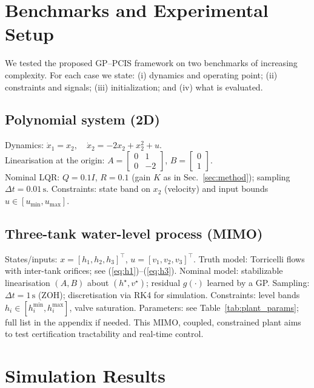 \documentclass[10pt]{article}
\newcommand{\1}{\mathbbm{1}}
\begin{document}
\section{Benchmarks and Experimental Setup}\label{sec:setup}

We tested the proposed GP–PCIS framework on two
benchmarks of increasing complexity. For each case we
state: (i) dynamics and operating point; (ii) constraints and signals;
(iii) initialization; and (iv) what is evaluated.

\subsection{Polynomial system (2D)}\label{subsec:poly}
Dynamics:
$\dot x_1 = x_2,\quad \dot x_2 = -2x_2 + x_2^2 + u$. \\
Linearisation at the origin:
$A=\begin{bmatrix}0&1\\0&-2\end{bmatrix}$,
$B=\begin{bmatrix}0\\1\end{bmatrix}$. \\
Nominal LQR: $Q=0.1I$, $R=0.1$ (gain $K$ as in Sec.~\ref{sec:method});
sampling $\Delta t=0.01\,\mathrm{s}$.
Constraints: state band on $x_2$ (velocity) and input bounds $u\in[u_{\min},u_{\max}]$.


\subsection{Three-tank water-level process (MIMO)}\label{subsec:tank}
States/inputs: $x=[h_1,h_2,h_3]^\top$, $u=[v_1,v_2,v_3]^\top$.
Truth model: Torricelli flows with inter-tank orifices; see (\ref{eq:h1})–(\ref{eq:h3}).
Nominal model: stabilizable linearisation $(A,B)$ about $(h^\star,v^\star)$; residual $g(\cdot)$ learned by a GP.
Sampling: $\Delta t=1\,\mathrm{s}$ (ZOH); discretisation via RK4 for simulation.
Constraints: level bands $h_i\in[h_i^{\min},h_i^{\max}]$, valve saturation.
Parameters: see Table~\ref{tab:plant_params}; full list in the appendix if needed.
This MIMO, coupled, constrained plant aims to test certification tractability and real-time control.

%
%
\section{Simulation Results}
\label{sec:results}
\end{document}

